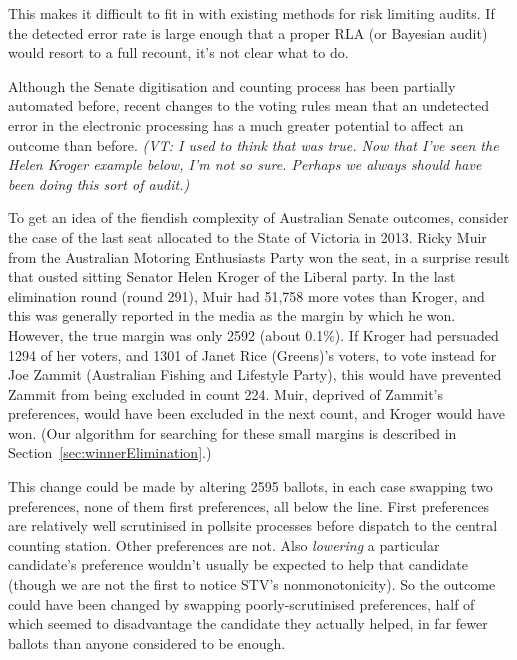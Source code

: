 \documentclass[10pt,a4paper]{article}
\newcommand{\VTNote}[1]{{\it(VT: #1)}}
\begin{document}
This makes it difficult to fit in with existing methods for risk limiting audits. If the detected error rate is large enough
that a proper RLA (or Bayesian audit) would resort to a full recount, it's not clear what to do.  

Although the Senate digitisation and counting process has been partially automated before, recent changes to the voting rules mean that an undetected error in the electronic processing has a much greater potential to affect an outcome than before.  \VTNote{I used to think that was true.  Now that I've seen the Helen Kroger example below, I'm not so sure.  Perhaps we always should have been doing this sort of audit.}

To get an idea of the fiendish complexity of Australian Senate outcomes, consider the case of the last seat allocated to the State of Victoria in 2013.  Ricky Muir from the Australian Motoring Enthusiasts Party won the seat, in a surprise result that ousted sitting Senator 
Helen Kroger of the Liberal party.  In the last elimination round (round 291), Muir had 51,758 more votes than Kroger, and this was generally reported in the media as the margin by which he won.  However, the true margin was only 2592 (about 0.1\%).  
If Kroger had persuaded 1294 of her voters, and 1301 of Janet Rice (Greens)’s voters, to  vote instead for Joe Zammit (Australian Fishing and Lifestyle Party), this would have prevented Zammit from being excluded in count 224. Muir, deprived of Zammit's preferences, would have been excluded in the next count, and Kroger would have won.   (Our algorithm for searching for these small margins is described in Section~\ref{sec:winnerElimination}.)

This change could be made by altering 2595 ballots, in each case swapping two preferences, none of them first preferences, all below the line.  First preferences are relatively well scrutinised in pollsite processes before dispatch to the central counting station.  Other preferences are not.   Also \emph{lowering} a particular candidate's preference wouldn't usually be expected to help that candidate (though we are not the first to notice STV's nonmonotonicity).  So the outcome could have been changed by swapping poorly-scrutinised preferences, half of which seemed to disadvantage the candidate they actually helped, in far fewer ballots than anyone considered to be enough.  
\end{document}
